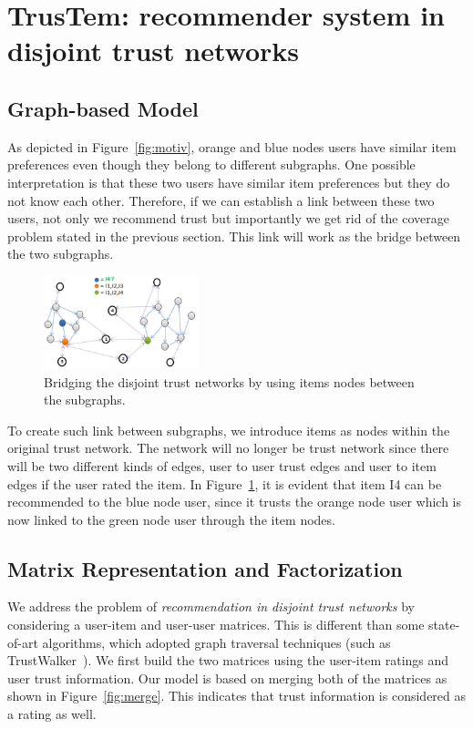 \documentclass[11pt, conference, onecolumn]{IEEEtran}
\begin{document}
\section{TrusTem: recommender system in disjoint trust networks} \label{sec:solution}

\subsection{Graph-based Model}
As depicted in Figure~\ref{fig:motiv}, orange and blue nodes users have similar item preferences even though they belong to different subgraphs. One possible interpretation is that these two users have similar item preferences but they do not know each other. Therefore, if we can establish a link between these two users, not only we recommend trust but importantly we get rid of the coverage problem stated in the previous section. This link will work as the bridge between the two subgraphs.

\begin{figure}[tp]
\centering
\includegraphics[width=0.4\textwidth]{fig2}
\caption{Bridging the disjoint trust networks by using items nodes between the subgraphs.}
\label{fig:link}
\end{figure}

To create such link between subgraphs, we introduce items as nodes within the original trust network. The network will no longer be trust network since there will be two different kinds of edges, user to user trust edges and user to item edges if the user rated the item. In Figure~\ref{fig:link}, it is evident that item I4 can be recommended to the blue node user, since it trusts the orange node user which is now linked to the green node user through the item nodes. 

\subsection{Matrix Representation and Factorization}
We address the problem of \textit{recommendation in disjoint trust networks} by considering a user-item and user-user matrices. This is different than some state-of-art algorithms, which adopted graph traversal techniques (such as TrustWalker~\cite{Jamali:2009}). We first build the two matrices using the user-item ratings and user trust information. Our model is based on merging both of the matrices as shown in Figure~\ref{fig:merge}. This indicates that trust information is considered as a rating as well.
\end{document}
